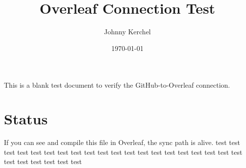 \documentclass[11pt]{article}
\title{Overleaf Connection Test}
\author{Johnny Kerchel}
\date{\today}
\begin{document}
\maketitle

This is a blank test document to verify the GitHub-to-Overleaf connection.

\section{Status}

If you can see and compile this file in Overleaf, the sync path is alive.
test test test test test test test test test test test test test test test test test test test test test test test test test test 
\end{document}
